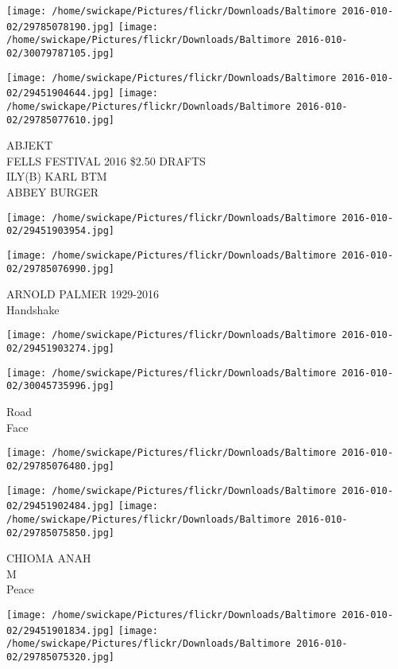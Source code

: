 \documentclass[10pt,letterpaper]{article}
\begin{document}
\texttt{[image: /home/swickape/Pictures/flickr/Downloads/Baltimore 2016-010-02/29785078190.jpg]}
\texttt{[image: /home/swickape/Pictures/flickr/Downloads/Baltimore 2016-010-02/30079787105.jpg]}

\texttt{[image: /home/swickape/Pictures/flickr/Downloads/Baltimore 2016-010-02/29451904644.jpg]}
\texttt{[image: /home/swickape/Pictures/flickr/Downloads/Baltimore 2016-010-02/29785077610.jpg]}

ABJEKT\\
FELLS FESTIVAL 2016 \$2.50 DRAFTS\\
ILY(B) KARL BTM\\
ABBEY BURGER
\pagebreak

\texttt{[image: /home/swickape/Pictures/flickr/Downloads/Baltimore 2016-010-02/29451903954.jpg]}

\vspace{0.25in}
\texttt{[image: /home/swickape/Pictures/flickr/Downloads/Baltimore 2016-010-02/29785076990.jpg]}

ARNOLD PALMER 1929{-}2016\\
Handshake
\pagebreak

\texttt{[image: /home/swickape/Pictures/flickr/Downloads/Baltimore 2016-010-02/29451903274.jpg]}

\vspace{0.25in}
\texttt{[image: /home/swickape/Pictures/flickr/Downloads/Baltimore 2016-010-02/30045735996.jpg]}

Road\\
Face
\pagebreak

\texttt{[image: /home/swickape/Pictures/flickr/Downloads/Baltimore 2016-010-02/29785076480.jpg]}

\vspace{0.25in}
\texttt{[image: /home/swickape/Pictures/flickr/Downloads/Baltimore 2016-010-02/29451902484.jpg]}
\texttt{[image: /home/swickape/Pictures/flickr/Downloads/Baltimore 2016-010-02/29785075850.jpg]}

CHIOMA ANAH\\
M\\
Peace
\pagebreak

\texttt{[image: /home/swickape/Pictures/flickr/Downloads/Baltimore 2016-010-02/29451901834.jpg]}
\texttt{[image: /home/swickape/Pictures/flickr/Downloads/Baltimore 2016-010-02/29785075320.jpg]}
\end{document}
